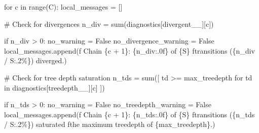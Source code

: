 \documentclass[
  letterpaper,
  DIV=11,
  numbers=noendperiod]{scrartcl}
\newenvironment{Shaded}{\begin{snugshade}}{\end{snugshade}}
\newcommand{\BuiltInTok}[1]{\textcolor[rgb]{0.00,0.23,0.31}{#1}}
\newcommand{\CommentTok}[1]{\textcolor[rgb]{0.37,0.37,0.37}{#1}}
\newcommand{\ControlFlowTok}[1]{\textcolor[rgb]{0.00,0.23,0.31}{#1}}
\newcommand{\DecValTok}[1]{\textcolor[rgb]{0.68,0.00,0.00}{#1}}
\newcommand{\KeywordTok}[1]{\textcolor[rgb]{0.00,0.23,0.31}{#1}}
\newcommand{\NormalTok}[1]{\textcolor[rgb]{0.00,0.23,0.31}{#1}}
\newcommand{\OperatorTok}[1]{\textcolor[rgb]{0.37,0.37,0.37}{#1}}
\newcommand{\SpecialCharTok}[1]{\textcolor[rgb]{0.37,0.37,0.37}{#1}}
\newcommand{\SpecialStringTok}[1]{\textcolor[rgb]{0.13,0.47,0.30}{#1}}
\newcommand{\StringTok}[1]{\textcolor[rgb]{0.13,0.47,0.30}{#1}}
\newcommand{\VariableTok}[1]{\textcolor[rgb]{0.07,0.07,0.07}{#1}}
\begin{document}
\begin{Shaded}
\begin{Highlighting}[]
  \ControlFlowTok{for}\NormalTok{ c }\KeywordTok{in} \BuiltInTok{range}\NormalTok{(C):}
\NormalTok{    local\_messages }\OperatorTok{=}\NormalTok{ []}
    
    \CommentTok{\# Check for divergences}
\NormalTok{    n\_div }\OperatorTok{=} \BuiltInTok{sum}\NormalTok{(diagnostics[}\StringTok{\textquotesingle{}divergent\_\_\textquotesingle{}}\NormalTok{][c])}
    
    \ControlFlowTok{if}\NormalTok{ n\_div }\OperatorTok{\textgreater{}} \DecValTok{0}\NormalTok{:}
\NormalTok{      no\_warning }\OperatorTok{=} \VariableTok{False}
\NormalTok{      no\_divergence\_warning }\OperatorTok{=} \VariableTok{False}
\NormalTok{      local\_messages.append(}\SpecialStringTok{f\textquotesingle{}  Chain }\SpecialCharTok{\{}\NormalTok{c }\OperatorTok{+} \DecValTok{1}\SpecialCharTok{\}}\SpecialStringTok{: }\SpecialCharTok{\{}\NormalTok{n\_div}\SpecialCharTok{:.0f\}}\SpecialStringTok{ of }\SpecialCharTok{\{}\NormalTok{S}\SpecialCharTok{\}}\SpecialStringTok{ \textquotesingle{}}
                            \SpecialStringTok{f\textquotesingle{}transitions (}\SpecialCharTok{\{}\NormalTok{n\_div }\OperatorTok{/}\NormalTok{ S}\SpecialCharTok{:.2\%\}}\SpecialStringTok{) diverged.\textquotesingle{}}\NormalTok{)}
    
    \CommentTok{\# Check for tree depth saturation}
\NormalTok{    n\_tds }\OperatorTok{=} \BuiltInTok{sum}\NormalTok{([ td }\OperatorTok{\textgreater{}=}\NormalTok{ max\_treedepth }
                  \ControlFlowTok{for}\NormalTok{ td }\KeywordTok{in}\NormalTok{ diagnostics[}\StringTok{\textquotesingle{}treedepth\_\_\textquotesingle{}}\NormalTok{][c] ])}
    
    \ControlFlowTok{if}\NormalTok{ n\_tds }\OperatorTok{\textgreater{}} \DecValTok{0}\NormalTok{:}
\NormalTok{      no\_warning }\OperatorTok{=} \VariableTok{False}
\NormalTok{      no\_treedepth\_warning }\OperatorTok{=} \VariableTok{False}
\NormalTok{      local\_messages.append(}\SpecialStringTok{f\textquotesingle{}  Chain }\SpecialCharTok{\{}\NormalTok{c }\OperatorTok{+} \DecValTok{1}\SpecialCharTok{\}}\SpecialStringTok{: }\SpecialCharTok{\{}\NormalTok{n\_tds}\SpecialCharTok{:.0f\}}\SpecialStringTok{ of }\SpecialCharTok{\{}\NormalTok{S}\SpecialCharTok{\}}\SpecialStringTok{ \textquotesingle{}}
                            \SpecialStringTok{f\textquotesingle{}transitions (}\SpecialCharTok{\{}\NormalTok{n\_tds }\OperatorTok{/}\NormalTok{ S}\SpecialCharTok{:.2\%\}}\SpecialStringTok{) saturated \textquotesingle{}}
                            \SpecialStringTok{f\textquotesingle{}the maximum treedepth of }\SpecialCharTok{\{}\NormalTok{max\_treedepth}\SpecialCharTok{\}}\SpecialStringTok{.\textquotesingle{}}\NormalTok{)}
    

\end{Highlighting}
\end{Shaded}
\end{document}
